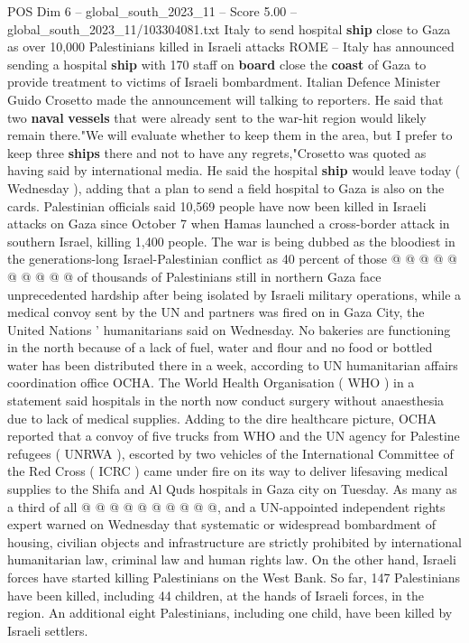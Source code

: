 \begin{textsample}{POS Dim 6 – global\_south\_2023\_11 – Score 5.00 – global\_south\_2023\_11/103304081.txt}  \label{ex:f6_pos_309}
Italy to send hospital \textbf{ship} close to Gaza as over 10,000 Palestinians killed in Israeli attacks ROME -- Italy has announced sending a hospital \textbf{ship} with 170 staff on \textbf{board} close the \textbf{coast} of Gaza to provide treatment to victims of Israeli bombardment.
Italian Defence Minister Guido Crosetto made the announcement will talking to reporters.
He said that two \textbf{naval} \textbf{vessels} that were already sent to the war-hit region would likely remain there."We will evaluate whether to keep them in the area, but I prefer to keep three \textbf{ships} there and not to have any regrets,"Crosetto was quoted as having said by international media.
He said the hospital \textbf{ship} would leave today ( Wednesday ), adding that a plan to send a field hospital to Gaza is also on the cards.
Palestinian officials said 10,569 people have now been killed in Israeli attacks on Gaza since October 7 when Hamas launched a cross-border attack in southern Israel, killing 1,400 people.
The war is being dubbed as the bloodiest in the generations-long Israel-Palestinian conflict as 40 percent of those @ @ @ @ @ @ @ @ @ @ of thousands of Palestinians still in northern Gaza face unprecedented hardship after being isolated by Israeli military operations, while a medical convoy sent by the UN and partners was fired on in Gaza City, the United Nations ' humanitarians said on Wednesday.
No bakeries are functioning in the north because of a lack of fuel, water and flour and no food or bottled water has been distributed there in a week, according to UN humanitarian affairs coordination office OCHA.
The World Health Organisation ( WHO ) in a statement said hospitals in the north now conduct surgery without anaesthesia due to lack of medical supplies.
Adding to the dire healthcare picture, OCHA reported that a convoy of five trucks from WHO and the UN agency for Palestine refugees ( UNRWA ), escorted by two vehicles of the International Committee of the Red Cross ( ICRC ) came under fire on its way to deliver lifesaving medical supplies to the Shifa and Al Quds hospitals in Gaza city on Tuesday.
As many as a third of all @ @ @ @ @ @ @ @ @ @, and a UN-appointed independent rights expert warned on Wednesday that systematic or widespread bombardment of housing, civilian objects and infrastructure are strictly prohibited by international humanitarian law, criminal law and human rights law.
On the other hand, Israeli forces have started killing Palestinians on the West Bank.
So far, 147 Palestinians have been killed, including 44 children, at the hands of Israeli forces, in the region.
An additional eight Palestinians, including one child, have been killed by Israeli settlers.

\end{textsample}
